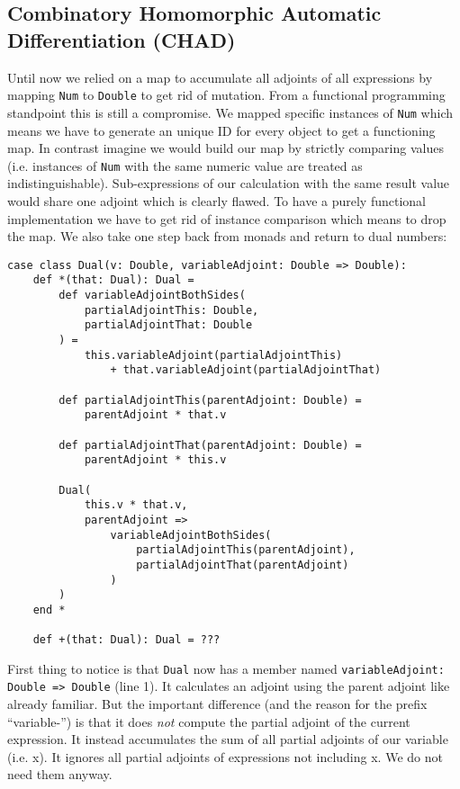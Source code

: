 \subsection{Combinatory Homomorphic Automatic Differentiation (CHAD)} \label{sec:chad}

Until now we relied on a map to accumulate all adjoints of all expressions by mapping \lstinline{Num} to \lstinline{Double} to get rid of mutation. From a functional programming standpoint this is still a compromise. We mapped specific instances of \lstinline{Num} which means we have to generate an unique ID for every object to get a functioning map. In contrast imagine we would build our map by strictly comparing values (i.e. instances of \lstinline{Num} with the same numeric value are treated as indistinguishable). Sub-expressions of our calculation with the same result value would share one adjoint which is clearly flawed. To have a purely functional implementation we have to get rid of instance comparison which means to drop the map. We also take one step back from monads and return to dual numbers:
\begin{lstlisting}
case class Dual(v: Double, variableAdjoint: Double => Double):
    def *(that: Dual): Dual =
        def variableAdjointBothSides(
            partialAdjointThis: Double, 
            partialAdjointThat: Double
        ) =
            this.variableAdjoint(partialAdjointThis) 
                + that.variableAdjoint(partialAdjointThat)

        def partialAdjointThis(parentAdjoint: Double) = 
            parentAdjoint * that.v
            
        def partialAdjointThat(parentAdjoint: Double) = 
            parentAdjoint * this.v

        Dual(
            this.v * that.v,
            parentAdjoint =>
                variableAdjointBothSides(
                    partialAdjointThis(parentAdjoint), 
                    partialAdjointThat(parentAdjoint)
                )
        )
    end *

    def +(that: Dual): Dual = ???
\end{lstlisting}
First thing to notice is that \lstinline{Dual} now has a member named \lstinline{variableAdjoint: Double => Double} (line 1). It calculates an adjoint using the parent adjoint like already familiar. But the important difference (and the reason for the prefix ``variable-'') is that it does \emph{not} compute the partial adjoint of the current expression. It instead accumulates the sum of all partial adjoints of our variable (i.e. x). It ignores all partial adjoints of expressions not including x. We do not need them anyway.

